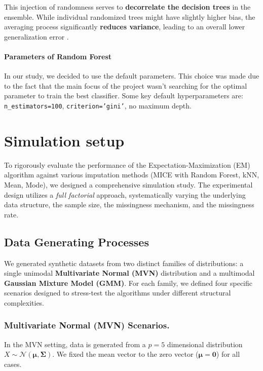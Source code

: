 \documentclass[11pt, a4paper]{article}
\begin{document}
This injection of randomness serves to \textbf{decorrelate the decision trees} in the ensemble.
While individual randomized trees might have slightly higher bias, the averaging process significantly \textbf{reduces variance}, leading to an overall lower generalization error \citep{Louppe2014}.

\paragraph{Parameters of Random Forest} In our study, we decided to use the default parameters. This choice was made due to the fact that the main focus of the project wasn't searching for the optimal parameter to train the best classifier. 
Some key default hyperparameters are: \texttt{n\_estimators=100}, \texttt{criterion='gini'}, no maximum depth. 


\section{Simulation setup} 

To rigorously evaluate the performance of the Expectation-Maximization (EM) algorithm against various imputation methods (MICE with Random Forest, kNN, Mean, Mode), we designed a comprehensive simulation study.
The experimental design utilizes a \textit{full factorial} approach, systematically varying the underlying data structure, the sample size, the missingness mechanism, and the missingness rate.

\subsection{Data Generating Processes}

We generated synthetic datasets from two distinct families of distributions: a single unimodal \textbf{Multivariate Normal (MVN)} distribution and a multimodal \textbf{Gaussian Mixture Model (GMM)}.
For each family, we defined four specific scenarios designed to stress-test the algorithms under different structural complexities.

\subsubsection*{Multivariate Normal (MVN) Scenarios.}
In the MVN setting, data is generated from a $p=5$ dimensional distribution $X \sim \mathcal{N}(\boldsymbol{\mu}, \boldsymbol{\Sigma})$.
We fixed the mean vector to the zero vector ($\boldsymbol{\mu} = \mathbf{0}$) for all cases.
\end{document}
